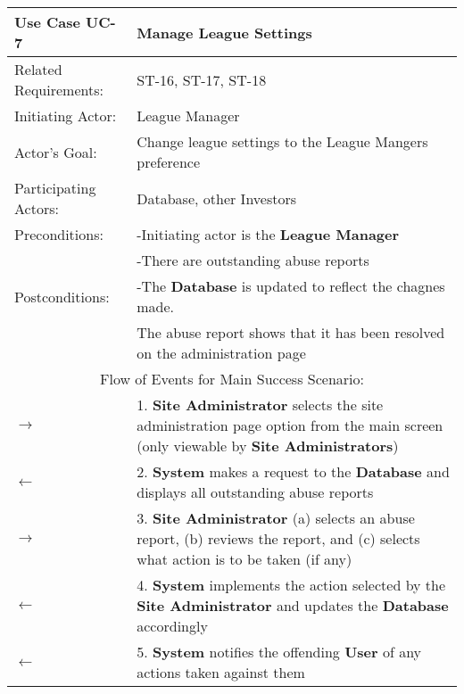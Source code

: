 \begin{centering}
\renewcommand\arraystretch{1.3} %
\label{UC-7}
\begin{longtable}{|p{1.2in} p{5in}|}
\hline
\bfseries{\color{color1}Use Case UC-7} &
\bfseries{\color{color1}Manage League Settings} \\
\hline
Related Requirements: & ST-16, ST-17, ST-18 \\
Initiating Actor:     & League Manager \\
Actor's Goal:         & Change league settings to the League Mangers preference \\
Participating Actors: & Database, other Investors \\
Preconditions:        & -Initiating actor is the \textbf{League Manager} \\
                      & -There are outstanding abuse reports \\
Postconditions:       & -The \textbf{Database} is updated to reflect the chagnes made. \\
 & The abuse report shows that it has been resolved on the administration page\\
\hline
\multicolumn{2}{|c|}{\color{color1}Flow of Events for Main Success Scenario:}\\
\hline
$\rightarrow$ & 1. \textbf{Site Administrator} selects the site administration page option from the main screen (only viewable by \textbf{Site Administrators}) \\
$\leftarrow$ & 2. \textbf{System} makes a request to the \textbf{Database} and displays all outstanding abuse reports\\
$\rightarrow$ & 3. \textbf{Site Administrator} (a) selects an abuse report, (b) reviews the report, and (c) selects what action is to be taken (if any)\\
$\leftarrow$ & 4. \textbf{System} implements the action selected by the \textbf{Site Administrator} and updates the \textbf{Database} accordingly \\
$\leftarrow$ & 5. \textbf{System} notifies the offending \textbf{User} of any actions taken against them \\
\hline
\end{longtable}
\end{centering}
